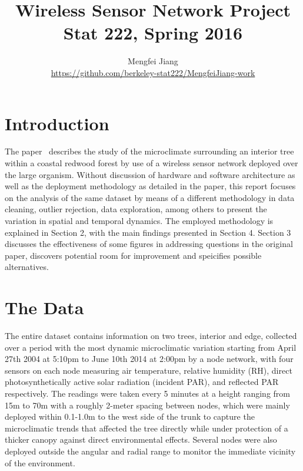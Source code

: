\documentclass[11pt]{article}
\title{Wireless Sensor Network Project\\
  Stat 222, Spring 2016}
\author{
  Mengfei Jiang\\
  \url{https://github.com/berkeley-stat222/MengfeiJiang-work}
}
\begin{document}
\maketitle



\section{Introduction}

The paper~\cite{tolle2005macroscope, yang2003redwoods} describes the study of the microclimate surrounding an interior tree within a coastal redwood forest by use of a wireless sensor network deployed over the large organism. Without discussion of hardware and software architecture as well as the deployment methodology as detailed in the paper, this report focuses on the analysis of the same dataset by means of a different methodology in data cleaning, outlier rejection, data exploration, among others to present the variation in spatial and temporal dynamics. The employed methodology is explained in Section 2, with the main findings presented in Section 4. Section 3 discusses the effectiveness of some figures in addressing questions in the original paper, discovers potential room for improvement and speicifies possible alternatives.


\section{The Data}
The entire dataset contains information on two trees, interior and edge, collected over a period with the most dynamic microclimatic variation starting from April 27th 2004 at 5:10pm to June 10th 2014 at 2:00pm by a node network, with four sensors on each node measuring air temperature, relative humidity (RH), direct photosynthetically active solar radiation (incident PAR), and reflected PAR respectively. The readings were taken every 5 minutes at a height ranging from 15m to 70m with a roughly 2-meter spacing between nodes, which were mainly deployed within 0.1-1.0m to the west side of the trunk to capture the microclimatic trends that affected the tree directly while under protection of a thicker canopy against direct environmental effects. Several nodes were also deployed outside the angular and radial range to monitor the immediate vicinity of the environment.
\end{document}
